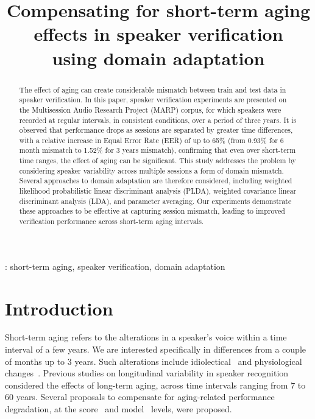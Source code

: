 \documentclass[a4paper]{article}
\title{Compensating for short-term aging effects in speaker verification \\ using domain adaptation}
\begin{document}
  \maketitle
  \begin{abstract}
The effect of aging can create considerable mismatch between train and test data in speaker verification. In this paper, speaker verification experiments are presented on the Multisession Audio Research Project (MARP) corpus, for which speakers were recorded at regular intervals, in consistent conditions, over a period of three years. It is observed that performance drops as sessions are separated by greater time differences, with a relative increase in Equal Error Rate (EER) of up to 65\% (from 0.93\% for 6 month mismatch to 1.52\% for 3 years mismatch), confirming that even over short-term time ranges, the effect of aging can be significant. This study addresses the problem by considering speaker variability across multiple sessions a form of domain mismatch. Several approaches to domain adaptation are therefore considered, including weighted likelihood probabilistic linear discriminant analysis (PLDA), weighted covariance linear discriminant analysis (LDA), and parameter averaging. Our experiments demonstrate these approaches to be effective at capturing session mismatch, leading to improved verification performance across short-term aging intervals.
  \end{abstract}
  : short-term aging, speaker verification, domain adaptation

\section{Introduction}

Short-term aging refers to the alterations in a speaker's voice within a time interval of a few years. We are interested specifically in differences from a couple of months up to $3$ years. Such alterations include idiolectical~\cite{paper3,paper4} and physiological changes~\cite{paper5,paper6}. Previous studies on longitudinal variability in speaker recognition~\cite{paper7, paper9,paper10,paper11} considered the effects of long-term aging, across time intervals ranging from $7$ to $60$ years. Several proposals to compensate for aging-related performance degradation, at the score~\cite{paper11} and model~\cite{paper10} levels, were proposed. 
\end{document}
